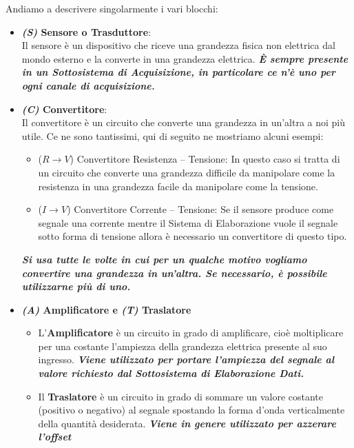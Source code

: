 \documentclass[12pt, letterpaper]{book}
\begin{document}
	Andiamo a descrivere singolarmente i vari blocchi:
  \begin{itemize}[leftmargin=1.2cm, itemsep=1pt, topsep=5pt]
    \item \textbf{\textit{(S)} Sensore o Trasduttore}: \\
          Il sensore è un dispositivo che riceve una grandezza fisica non elettrica dal mondo esterno e la converte in una grandezza elettrica. \textbf{\textit{È sempre presente in un Sottosistema di Acquisizione, in particolare ce n’è uno per ogni canale di acquisizione.}}
    \item \textbf{\textit{(C)} Convertitore}: \\
          Il convertitore è un circuito che converte una grandezza in un’altra a noi più utile. Ce ne sono tantissimi, qui di seguito ne mostriamo alcuni esempi:
          \begin{itemize}[itemsep=1pt, topsep=2pt]
            \item ($R \rightarrow V$) Convertitore Resistenza -- Tensione: In questo caso si tratta di un circuito che converte una grandezza difficile da manipolare come la resistenza in una grandezza facile da manipolare come la tensione.
            \item ($I \rightarrow V$) Convertitore Corrente – Tensione: Se il sensore produce come segnale una corrente mentre il Sistema di Elaborazione vuole il segnale sotto forma di tensione allora è necessario un convertitore di questo tipo.
          \end{itemize}
          \textbf{\textit{Si usa tutte le volte in cui per un qualche motivo vogliamo convertire una grandezza in un’altra. Se necessario, è possibile utilizzarne più di uno.}}
    \item \textbf{\textit{(A)} Amplificatore e \textit{(T)} Traslatore}
          \begin{itemize}
            \item L’\textbf{Amplificatore} è un circuito in grado di amplificare, cioè moltiplicare per una costante l’ampiezza della grandezza elettrica presente al suo ingresso.
              \textbf{\textit{Viene utilizzato per portare l’ampiezza del segnale al valore richiesto dal Sottosistema di Elaborazione Dati.}} 

            \item Il \textbf{Traslatore} è un circuito in grado di sommare un valore costante (positivo o negativo) al segnale spostando la forma d’onda verticalmente della quantità desiderata. \textbf{\textit{Viene in genere utilizzato per azzerare l’offset}}


\end{itemize}
\end{itemize}
\end{document}
